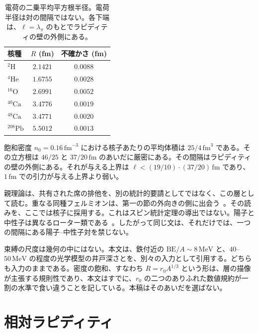 \documentclass[a4paper]{article}
\begin{document}
\begin{table}[htbp]
\centering
\caption{電荷の二乗平均平方根半径。電荷半径は対の間隔ではない。各下端は、\(\ell=\lambda_\pi\) のもとでラピディティの壁の外側にある。}
\label{tab:radii}
\begin{tabular}{lcc}
\hline
核種 & \(R\) (fm) & 不確かさ (fm) \\
\hline
\({}^{2}\mathrm{H}\) & \(2.1421\) & \(0.0088\) \\
\({}^{4}\mathrm{He}\) & \(1.6755\) & \(0.0028\) \\
\({}^{16}\mathrm{O}\) & \(2.6991\) & \(0.0052\) \\
\({}^{40}\mathrm{Ca}\) & \(3.4776\) & \(0.0019\) \\
\({}^{48}\mathrm{Ca}\) & \(3.4771\) & \(0.0020\) \\
\({}^{208}\mathrm{Pb}\) & \(5.5012\) & \(0.0013\) \\
\hline
\end{tabular}
\end{table}

飽和密度 \(n_0=0.16\,\mathrm{fm}^{-3}\) における核子あたりの平均体積は \(25/4\,\mathrm{fm}^{3}\) である。その立方根は \(46/25\) と \(37/20\,\mathrm{fm}\) のあいだに厳密にある。その間隔はラピディティの壁の外側にある。それが与える上界は \(\ell<(19/10)\cdot(37/20)\,\mathrm{fm}\) であり、\(1\,\mathrm{fm}\) での引力が与える上界より弱い。

親理論は、共有された席の排他を、別の統計的要請としてではなく、この層として読む。重なる同種フェルミオンは、第一の節の外向きの側に出会う~\cite{dst-main}。その読みを、ここでは核子に採用する。これはスピン統計定理の導出ではない。陽子と中性子は異なるローター類である~\cite{dst-dio}。したがって同じ文は、それだけでは、一つの間隔にある陽子--中性子対を禁じない。

束縛の尺度は幾何の中にはない。本文は、鉄付近の \(\mathrm{BE}/A\sim 8\,\mathrm{MeV}\) と、\(40\)--\(50\,\mathrm{MeV}\) の程度の光学模型の井戸深さとを、別々の入力として引用する。どちらも入力のままである。密度の飽和、すなわち \(R=r_0 A^{1/3}\) という形は、層の描像が主張する規則性であり、本文はすでに、\(r_0\) の二つのありふれた数値規約が一割の水準で食い違うことを記している。本稿はそのあいだを選ばない。

\section{相対ラピディティ}
\label{sec:rapidity}
\end{document}
